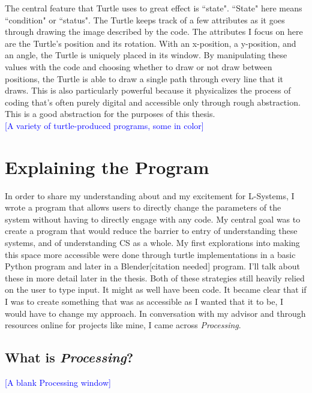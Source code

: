 \documentclass[12pt,twoside]{reedthesis}
\begin{document}
	The central feature that Turtle uses to great effect is ``state". ``State" here means ``condition" or ``status". The Turtle keeps track of a few attributes as it goes through drawing the image described by the code. The attributes I focus on here are the Turtle's position and its rotation. With an x-position, a y-position, and an angle, the Turtle is uniquely placed in its window. By manipulating these values with the code and choosing whether to draw or not draw between positions, the Turtle is able to draw a single path through every line that it draws. This is also particularly powerful because it physicalizes the process of coding that's often purely digital and accessible only through rough abstraction. This is a good abstraction for the purposes of this thesis.\\
	
	\textcolor{blue}{[A variety of turtle-produced programs, some in color]}\\


\chapter{Explaining the Program}

	In order to share my understanding about and my excitement for L-Systems, I wrote a program that allows users to directly change the parameters of the system without having to directly engage with any code. My central goal was to create a program that would reduce the barrier to entry of understanding these systems, and of understanding CS as a whole. My first explorations into making this space more accessible were done through turtle implementations in a basic Python program and later in a Blender[citation needed] program. I'll talk about these in more detail later in the thesis. Both of these strategies still heavily relied on the user to type input. It might as well have been code. It became clear that if I was to create something that was as accessible as I wanted that it to be, I would have to change my approach. In conversation with my advisor and through resources online for projects like mine, I came across \textit{Processing}.\\
	
\section{What is \textit{Processing}?}

	\textcolor{blue}{[A blank Processing window]}\\
\end{document}

